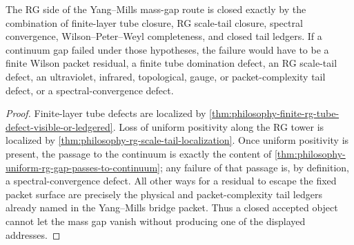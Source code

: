 \begin{theorem}
\label{thm:philosophy-yang-mills-rg-closure-boundary}
The RG side of the Yang--Mills mass-gap route is closed exactly by the
combination of finite-layer tube closure, RG scale-tail closure, spectral
convergence, Wilson--Peter--Weyl completeness, and closed tail ledgers. If a
continuum gap failed under those hypotheses, the failure would have to be a
finite Wilson packet residual, a finite tube domination defect, an RG
scale-tail defect, an ultraviolet, infrared, topological, gauge, or
packet-complexity tail defect, or a spectral-convergence defect.
\end{theorem}
\begin{proof}
Finite-layer tube defects are localized by
\autoref{thm:philosophy-finite-rg-tube-defect-visible-or-ledgered}. Loss of
uniform positivity along the RG tower is localized by
\autoref{thm:philosophy-rg-scale-tail-localization}. Once uniform positivity
is present, the passage to the continuum is exactly the content of
\autoref{thm:philosophy-uniform-rg-gap-passes-to-continuum}; any failure of
that passage is, by definition, a spectral-convergence defect. All other
ways for a residual to escape the fixed packet surface are precisely the
physical and packet-complexity tail ledgers already named in the
Yang--Mills bridge packet. Thus a closed accepted object cannot let the mass
gap vanish without producing one of the displayed addresses.
\end{proof}

